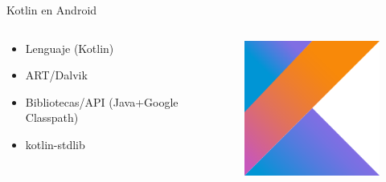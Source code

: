 \documentclass[aspectratio=169]{beamer}
\begin{document}
\begin{frame}[fragile]{Kotlin en Android}
    \begin{columns}
        \begin{column}{0.5\textwidth}
            \begin{itemize}
                \item Lenguaje (Kotlin)
                \item ART/Dalvik
                \item Bibliotecas/API (Java+Google Classpath)
                \item kotlin-stdlib
            \end{itemize}
        \end{column}
        \begin{column}{0.5\textwidth}  %
            \begin{figure}
                \centering
                \includegraphics[width=0.4\linewidth]{Images/kotlin}
            \end{figure}
        \end{column}
    \end{columns}
\end{frame}
\end{document}
